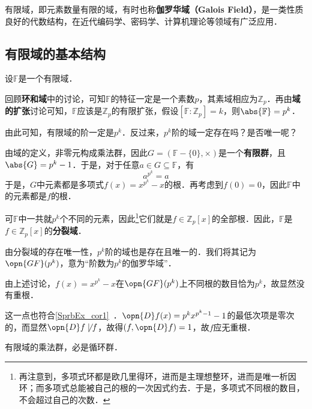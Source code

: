 

有限域，即元素数量有限的域，有时也称\textbf{伽罗华域（Galois Field）}，是一类性质良好的代数结构，在近代编码学、密码学、计算机理论等领域有广泛应用．

\subsection{有限域的基本结构}



设$\mathbb{F}$是一个有限域．

回顾\textbf{环和域}中的讨论，可知$\mathbb{F}$的特征一定是一个素数$p$，其素域相应为$\mathbb{Z}_p$．再由\textbf{域的扩张}讨论可知，$\mathbb{F}$应该是$\mathbb{Z}_p$的有限扩张，假设$[\mathbb{F}:\mathbb{Z}_p]=k$，则$\abs{\mathbb{F}}=p^k$．

由此可知，有限域的阶一定是$p^k$．反过来，$p^k$阶的域一定存在吗？是否唯一呢？

由域的定义，非零元构成乘法群，因此$G=(\mathbb{F}-\{0\}, \times)$是一个\textbf{有限群}，且$\abs{G}=p^k-1$．于是，对于任意$a\in G\subseteq\mathbb{F}$，有
\begin{equation}
a^{p^k}=a
\end{equation}
于是，$G$中元素都是多项式$f(x)=x^{p^k}-x$的根．再考虑到$f(0)=0$，因此$\mathbb{F}$中的元素都是$f$的根．

可$\mathbb{F}$中一共就$p^k$个不同的元素，因此\footnote{再注意到，多项式环都是欧几里得环，进而是主理想整环，进而是唯一析因环；而多项式总能被自己的根的一次因式约去．于是，多项式不同根的数目，不会超过自己的次数．}它们就是$f\in\mathbb{Z}_p[x]$的全部根．因此，$\mathbb{F}$是$f\in\mathbb{Z}_p[x]$的\textbf{分裂域}．

由分裂域的存在唯一性，$p^k$阶的域也是存在且唯一的．我们将其记为$\opn{GF}(p^k)$，意为“阶数为$p^k$的伽罗华域”．

\begin{example}{}
由上述讨论，$f(x)=x^{p^k}-x$在$\opn{GF}(p^k)$上不同根的数目恰为$p^k$，故显然没有重根．

这一点也符合\autoref{SprbEx_cor1}~．$\opn{D}f(x)=p^kx^{p^k-1}-1$的最低次项是零次的，而显然$\opn{D}f\not\mid f$，故得$(f, \opn{D}f)=1$，故$f$应无重根．
\end{example}


\begin{theorem}{}\label{FntFld_the1}
有限域的乘法群，必是循环群．
\end{theorem}

